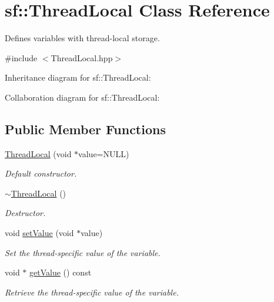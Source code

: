 \hypertarget{classsf_1_1_thread_local}{}\section{sf\+:\+:Thread\+Local Class Reference}
\label{classsf_1_1_thread_local}


Defines variables with thread-\/local storage.  




{\ttfamily \#include $<$Thread\+Local.\+hpp$>$}



Inheritance diagram for sf\+:\+:Thread\+Local\+:


Collaboration diagram for sf\+:\+:Thread\+Local\+:
\subsection*{Public Member Functions}
\begin{DoxyCompactItemize}
\item 
\hyperlink{classsf_1_1_thread_local_a44ea3c4be4eef118080275cbf4cf04cd}{Thread\+Local} (void $\ast$value=N\+U\+LL)
\begin{DoxyCompactList}\small\item\em Default constructor. \end{DoxyCompactList}\item 
\mbox{\label{classsf_1_1_thread_local_acc612bddfd0f0507b1c5da8b3b8c75c2}} 
\hyperlink{classsf_1_1_thread_local_acc612bddfd0f0507b1c5da8b3b8c75c2}{$\sim$\+Thread\+Local} ()
\begin{DoxyCompactList}\small\item\em Destructor. \end{DoxyCompactList}\item 
void \hyperlink{classsf_1_1_thread_local_ab7e334c83d77644a8e67ee31c3230007}{set\+Value} (void $\ast$value)
\begin{DoxyCompactList}\small\item\em Set the thread-\/specific value of the variable. \end{DoxyCompactList}\item 
void $\ast$ \hyperlink{classsf_1_1_thread_local_ad68823496eb065b4b695c3468fa869bc}{get\+Value} () const
\begin{DoxyCompactList}\small\item\em Retrieve the thread-\/specific value of the variable. \end{DoxyCompactList}\end{DoxyCompactItemize}



